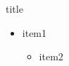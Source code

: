 \begin{frame}{title}
\begin{itemize}
\item item1
\begin{itemize}
\item item2
\end{itemize}
\end{itemize}
\vspace{20cm}
\end{frame}